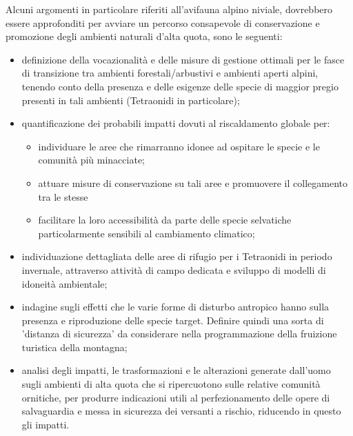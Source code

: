 \documentclass[10pt,twoside,openany,x11names,svgnames,italian,a5paper,dvipsnames,table]{memoir}
\newcommand{\ph}{\emph{Ph}. }
\begin{document}
Alcuni argomenti in particolare riferiti all'avifauna alpino niviale, dovrebbero essere approfonditi per avviare un percorso consapevole di conservazione e promozione degli ambienti naturali d'alta quota, sono le seguenti:
\begin{itemize}\itemsep0pt
  \item definizione della vocazionalità e delle misure di gestione ottimali per le fasce di transizione tra ambienti forestali/arbustivi e ambienti aperti alpini, tenendo conto della presenza e delle esigenze delle specie di maggior pregio presenti in tali ambienti (Tetraonidi in particolare);
  \item quantificazione dei probabili impatti dovuti al riscaldamento globale per:
    \begin{itemize}\itemsep0pt
      \item individuare le aree che rimarranno idonee ad ospitare le specie e le comunità più minacciate;
      \item attuare misure di conservazione su tali aree e promuovere il collegamento tra le stesse 
      \item facilitare la loro accessibilità da parte delle specie selvatiche particolarmente sensibili al cambiamento climatico;
    \end{itemize}
  \item individuazione dettagliata delle aree di rifugio per i Tetraonidi in periodo invernale, attraverso attività di campo dedicata e sviluppo di modelli di idoneità ambientale;
  \item indagine sugli effetti che le varie forme di disturbo antropico hanno sulla presenza e riproduzione delle specie target. Definire quindi una sorta di 'distanza di sicurezza' da considerare nella programmazione della fruizione turistica della montagna;
  \item analisi degli impatti, le trasformazioni e le alterazioni generate dall'uomo sugli ambienti di alta quota che si ripercuotono sulle relative comunità ornitiche, per produrre indicazioni utili al perfezionamento delle opere di salvaguardia e messa in sicurezza dei versanti a rischio, riducendo in questo gli impatti. 
\end{itemize}

\begin{comment}
\vspace*{\fill}
\begin{center}
\texttt{[image: mendini\_organetto.jpg]}
\end{center}
\captionof*{figure}{\textbf{Organetto} \emph{Carduelis flammea}. Fringillide nidificante e migratore parziale tipico degli arbusteti e pascoli a larice di alta quota (\ph Mauro Mendini).}
\vspace*{\fill}
\end{comment}
\end{document}
